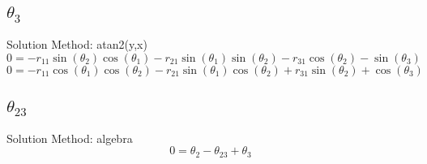 \subsection{$\theta_{3}$ }
Solution Method:  atan2(y,x)
\begin{dmath}
0 = - r_{11} \sin{\left (\theta_{2} \right )} \cos{\left (\theta_{1} \right )} - r_{21} \sin{\left (\theta_{1} \right )} \sin{\left (\theta_{2} \right )} - r_{31} \cos{\left (\theta_{2} \right )} - \sin{\left (\theta_{3} \right )}
\end{dmath}
\begin{dmath}
0 = - r_{11} \cos{\left (\theta_{1} \right )} \cos{\left (\theta_{2} \right )} - r_{21} \sin{\left (\theta_{1} \right )} \cos{\left (\theta_{2} \right )} + r_{31} \sin{\left (\theta_{2} \right )} + \cos{\left (\theta_{3} \right )}
\end{dmath}
\subsection{$\theta_{23}$ }
Solution Method:  algebra
\begin{dmath}
0 = \theta_{2} - \theta_{23} + \theta_{3}
\end{dmath}
